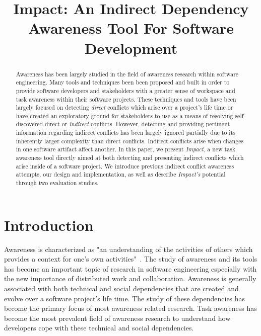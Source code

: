 \documentclass[conference]{IEEEtran}
\begin{document}
\title{Impact: An Indirect Dependency Awareness Tool For Software Development}

\author{
\and
{}
}

\maketitle

\begin{abstract}
Awareness has been largely studied in the field of awareness research within
software engineering. Many tools and techniques been been proposed and built
in order to provide software developers and stakeholders with a greater
sense of workspace and task awareness within their software projects. These
techniques and tools have been largely focused on detecting \textit{direct} 
conflicts which arise over a project's life time or have created 
an exploratory ground for stakeholders to use as a means of resolving self
discovered direct or \textit{indirect} conflicts. However, detecting 
and providing pertinent information regarding indirect conflicts has been
largely ignored partially due to its inherently larger
complexity than direct conflicts. Indirect conflicts arise when changes
in one software artifact affect another. In this paper, we present
\textit{Impact}, a new task awareness tool directly aimed at both detecting
and presenting indirect conflicts which arise inside of a software project.
We introduce previous indirect conflict awareness attempts, our design 
and implementation, as well as describe \textit{Impact's} potential through
two evaluation studies. 
\end{abstract}


\section{Introduction}
Awareness is characterized as "an understanding of the activities of others
which provides a context for one's own activities"~\cite{Dourish:1992:ACS}.
The study of awareness and its tools has become an important topic of
research in software engineering especially with the new importance of
distributed work and collaboration. Awareness is generally associated with
both technical and social dependencies that are created and evolve over
a software project's life time. The study of these dependencies has become
the primary focus of most awareness related research. Task awareness has
become the most prevalent field of awareness research to understand 
how developers cope with these technical and social dependencies.
\end{document}
